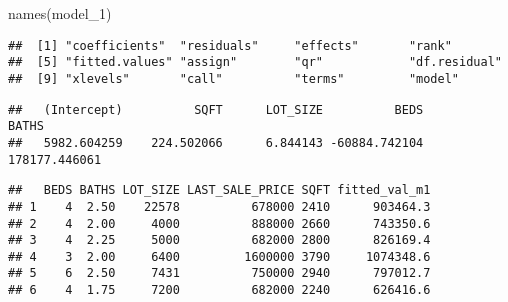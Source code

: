 \documentclass[
]{article}
\newenvironment{Shaded}{\begin{snugshade}}{\end{snugshade}}
\newcommand{\FunctionTok}[1]{\textcolor[rgb]{0.00,0.00,0.00}{#1}}
\newcommand{\NormalTok}[1]{#1}
\newcommand{\OtherTok}[1]{\textcolor[rgb]{0.56,0.35,0.01}{#1}}
\newcommand{\SpecialCharTok}[1]{\textcolor[rgb]{0.00,0.00,0.00}{#1}}
\begin{document}
\begin{Shaded}
\begin{Highlighting}[]
\FunctionTok{names}\NormalTok{(model\_1)}
\end{Highlighting}
\end{Shaded}

\begin{verbatim}
##  [1] "coefficients"  "residuals"     "effects"       "rank"         
##  [5] "fitted.values" "assign"        "qr"            "df.residual"  
##  [9] "xlevels"       "call"          "terms"         "model"
\end{verbatim}

\begin{Shaded}
\end{Shaded}

\begin{verbatim}
##   (Intercept)          SQFT      LOT_SIZE          BEDS         BATHS 
##   5982.604259    224.502066      6.844143 -60884.742104 178177.446061
\end{verbatim}

\begin{Shaded}
\end{Shaded}

\begin{verbatim}
##   BEDS BATHS LOT_SIZE LAST_SALE_PRICE SQFT fitted_val_m1
## 1    4  2.50    22578          678000 2410      903464.3
## 2    4  2.00     4000          888000 2660      743350.6
## 3    4  2.25     5000          682000 2800      826169.4
## 4    3  2.00     6400         1600000 3790     1074348.6
## 5    6  2.50     7431          750000 2940      797012.7
## 6    4  1.75     7200          682000 2240      626416.6
\end{verbatim}

\begin{Shaded}
\end{Shaded}
\end{document}

